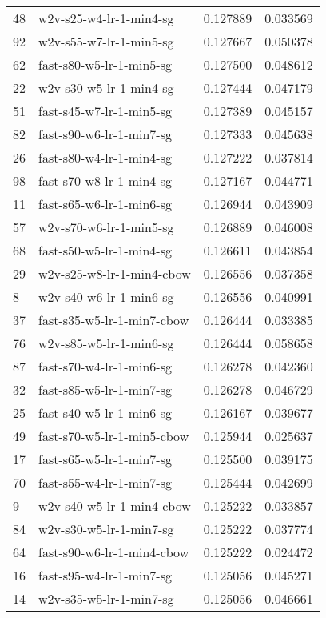 \begin{tabular}{llrr}
48 &      w2v-s25-w4-lr-1-min4-sg &  0.127889 &  0.033569 \\
92 &      w2v-s55-w7-lr-1-min5-sg &  0.127667 &  0.050378 \\
62 &     fast-s80-w5-lr-1-min5-sg &  0.127500 &  0.048612 \\
22 &      w2v-s30-w5-lr-1-min4-sg &  0.127444 &  0.047179 \\
51 &     fast-s45-w7-lr-1-min5-sg &  0.127389 &  0.045157 \\
82 &     fast-s90-w6-lr-1-min7-sg &  0.127333 &  0.045638 \\
26 &     fast-s80-w4-lr-1-min4-sg &  0.127222 &  0.037814 \\
98 &     fast-s70-w8-lr-1-min4-sg &  0.127167 &  0.044771 \\
11 &     fast-s65-w6-lr-1-min6-sg &  0.126944 &  0.043909 \\
57 &      w2v-s70-w6-lr-1-min5-sg &  0.126889 &  0.046008 \\
68 &     fast-s50-w5-lr-1-min4-sg &  0.126611 &  0.043854 \\
29 &    w2v-s25-w8-lr-1-min4-cbow &  0.126556 &  0.037358 \\
8  &      w2v-s40-w6-lr-1-min6-sg &  0.126556 &  0.040991 \\
37 &   fast-s35-w5-lr-1-min7-cbow &  0.126444 &  0.033385 \\
76 &      w2v-s85-w5-lr-1-min6-sg &  0.126444 &  0.058658 \\
87 &     fast-s70-w4-lr-1-min6-sg &  0.126278 &  0.042360 \\
32 &     fast-s85-w5-lr-1-min7-sg &  0.126278 &  0.046729 \\
25 &     fast-s40-w5-lr-1-min6-sg &  0.126167 &  0.039677 \\
49 &   fast-s70-w5-lr-1-min5-cbow &  0.125944 &  0.025637 \\
17 &     fast-s65-w5-lr-1-min7-sg &  0.125500 &  0.039175 \\
70 &     fast-s55-w4-lr-1-min7-sg &  0.125444 &  0.042699 \\
9  &    w2v-s40-w5-lr-1-min4-cbow &  0.125222 &  0.033857 \\
84 &      w2v-s30-w5-lr-1-min7-sg &  0.125222 &  0.037774 \\
64 &   fast-s90-w6-lr-1-min4-cbow &  0.125222 &  0.024472 \\
16 &     fast-s95-w4-lr-1-min7-sg &  0.125056 &  0.045271 \\
14 &      w2v-s35-w5-lr-1-min7-sg &  0.125056 &  0.046661 \\

\end{tabular}
